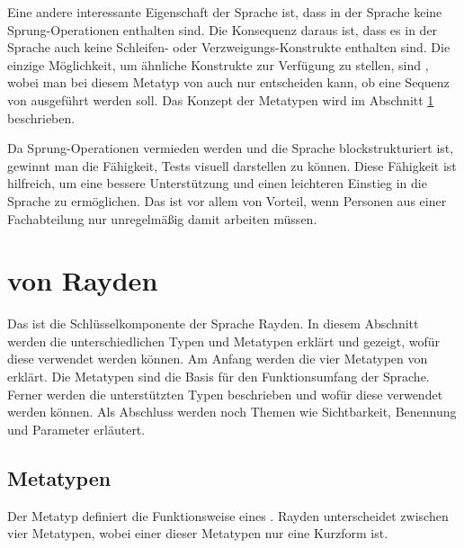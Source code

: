 \SuperPar
Eine andere interessante Eigenschaft der Sprache ist, dass in der Sprache keine Sprung-Operationen enthalten sind. Die Konsequenz daraus ist, dass es in der Sprache auch keine Schleifen- oder Verzweigungs-Konstrukte enthalten sind. Die einzige Möglichkeit, um ähnliche Konstrukte zur Verfügung zu stellen, sind , wobei man bei diesem Metatyp von  auch nur entscheiden kann, ob eine Sequenz von  ausgeführt werden soll. Das Konzept der Metatypen wird im Abschnitt \ref{cha:Keyword} beschrieben. 

\SuperPar
Da Sprung-Operationen vermieden werden und die Sprache blockstrukturiert ist, gewinnt man die Fähigkeit, Tests visuell darstellen zu können. Diese Fähigkeit ist hilfreich, um eine bessere Unterstützung und einen leichteren Einstieg in die Sprache zu ermöglichen. Das ist vor allem von Vorteil, wenn Personen aus einer Fachabteilung nur unregelmäßig damit arbeiten müssen. 


\section{ von Rayden}
\label{cha:Keyword}

Das  ist die Schlüsselkomponente der Sprache Rayden. In diesem Abschnitt werden die unterschiedlichen Typen und Metatypen erklärt und gezeigt, wofür diese verwendet werden können. Am Anfang werden die vier Metatypen von  erklärt. Die Metatypen sind die Basis für den Funktionsumfang der Sprache. Ferner werden die unterstützten Typen beschrieben und wofür diese verwendet werden können. Als Abschluss werden noch Themen wie Sichtbarkeit, Benennung und Parameter erläutert.


\subsection{Metatypen}

Der Metatyp definiert die Funktionsweise eines . Rayden unterscheidet zwischen vier Metatypen, wobei einer dieser Metatypen nur eine Kurzform ist.


